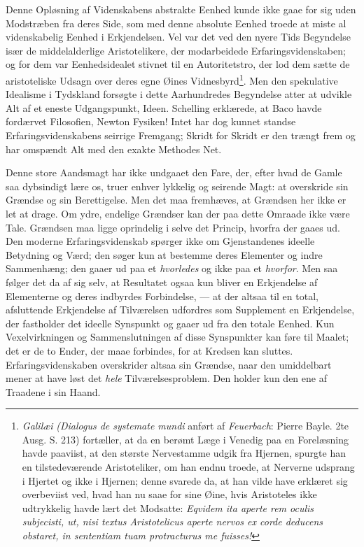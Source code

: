 \documentclass[12pt,a4paper,openany]{book}
\newcommand{\opage}[1]{\marginnote{\footnotesize\textit{[#1]}}}
\begin{document}
Denne Opløsning af Videnskabens abstrakte Eenhed
kunde ikke gaae for sig uden Modstræben fra deres Side,
som med denne absolute Eenhed troede at miste al videnskabelig
Eenhed i Erkjendelsen. Vel var det ved den nyere
Tids Begyndelse især de middelalderlige Aristotelikere, der modarbeidede
Erfaringsvidenskaben; og for dem var Eenhedsidealet
stivnet til en Autoritetstro, der lod dem sætte de
aristoteliske Udsagn over deres egne Øines Vidnesbyrd\footnote{\emph{\textit{Galilæi}} \textit{(Dialogus de systemate mundi} anført af \emph{Feuerbach}: Pierre Bayle. 2te Ausg. S. 213) fortæller, at da en berømt Læge i Venedig paa en Forelæsning havde paaviist, at den største Nervestamme udgik fra Hjernen, spurgte han en tilstedeværende Aristoteliker, om han endnu troede, at Nerverne udsprang i Hjertet og ikke i Hjernen; denne svarede da, at han vilde have erklæret sig overbeviist ved, hvad han nu saae for sine Øine, hvis Aristoteles ikke udtrykkelig havde lært det Modsatte: \textit{Eqvidem ita aperte rem oculis subjecisti, ut, nisi textus Aristotelicus aperte nervos ex corde deducens obstaret, in sententiam tuam protracturus me fuisses!}}.
Men den spekulative Idealisme i Tydskland forsøgte i dette
Aarhundredes Begyndelse atter at udvikle Alt af et eneste
Udgangspunkt, Ideen. Schelling erklærede, at Baco havde
fordærvet Filosofien, Newton Fysiken! Intet har dog
kunnet standse Erfaringsvidenskabens seirrige Fremgang;
Skridt for Skridt er den trængt frem og har omspændt Alt
med den exakte Methodes Net.

Denne store Aandsmagt har ikke undgaaet den Fare,
der, efter hvad de Gamle saa dybsindigt lære os, truer enhver
lykkelig og seirende Magt: at overskride sin Grændse og sin
\opage{195}Berettigelse. Men det maa fremhæves, at Grændsen her
ikke er let at drage. Om ydre, endelige Grændser kan der
paa dette Omraade ikke være Tale. Grændsen maa ligge
oprindelig i selve det Princip, hvorfra der gaaes ud. Den
moderne Erfaringsvidenskab spørger ikke om Gjenstandenes
ideelle Betydning og Værd; den søger kun at bestemme deres
Elementer og indre Sammenhæng; den gaaer ud paa et
\emph{hvorledes} og ikke paa et \emph{hvorfor}. Men saa følger det
da af sig selv, at Resultatet ogsaa kun bliver en Erkjendelse
af Elementerne og deres indbyrdes Forbindelse, --- at der
altsaa til en total, afsluttende Erkjendelse af Tilværelsen udfordres
som Supplement en Erkjendelse, der fastholder det
ideelle Synspunkt og gaaer ud fra den totale Eenhed. Kun
Vexelvirkningen og Sammenslutningen af disse Synspunkter
kan føre til Maalet; det er de to Ender, der maae forbindes,
for at Kredsen kan sluttes. Erfaringsvidenskaben overskrider
altsaa sin Grændse, naar den umiddelbart mener at have
løst det \emph{hele} Tilværelsesproblem. Den holder kun den ene
af Traadene i sin Haand.
\end{document}
